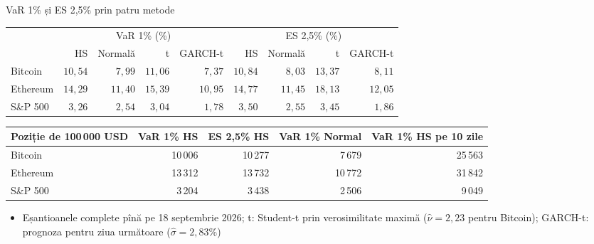 \begin{frame}{VaR 1\% și ES 2,5\% prin patru metode}
\itemsize{\footnotesize}
\begin{center}
\scriptsize
\begin{tabular}{lrrrrrrrr}
\toprule
& \multicolumn{4}{c}{VaR 1\% (\%)} & \multicolumn{4}{c}{ES 2,5\% (\%)} \\ & HS & Normală & t & GARCH-t & HS & Normală & t & GARCH-t \\
\midrule
Bitcoin & $10{,}54$ & $7{,}99$ & $11{,}06$ & $7{,}37$ & $10{,}84$ & $8{,}03$ & $13{,}37$ & $8{,}11$ \\
Ethereum & $14{,}29$ & $11{,}40$ & $15{,}39$ & $10{,}95$ & $14{,}77$ & $11{,}45$ & $18{,}13$ & $12{,}05$ \\
S\&P 500 & $3{,}26$ & $2{,}54$ & $3{,}04$ & $1{,}78$ & $3{,}50$ & $2{,}55$ & $3{,}45$ & $1{,}86$ \\
\bottomrule
\end{tabular}
\end{center}
\begin{center}
\scriptsize
\begin{tabular}{lrrrr}
\toprule
Poziție de 100\,000 USD & VaR 1\% HS & ES 2,5\% HS & VaR 1\% Normal & VaR 1\% HS pe 10 zile \\
\midrule
Bitcoin & 10\,006 & 10\,277 & 7\,679 & 25\,563 \\
Ethereum & 13\,312 & 13\,732 & 10\,772 & 31\,842 \\
S\&P 500 & 3\,204 & 3\,438 & 2\,506 & 9\,049 \\
\bottomrule
\end{tabular}
\end{center}
\begin{itemize}
    \item Eșantioanele complete pînă pe 18 septembrie 2026; t: Student-t prin verosimilitate maximă ($\hat\nu = 2{,}23$ pentru Bitcoin); GARCH-t: prognoza pentru ziua următoare ($\hat\sigma = 2{,}83\%$)
\end{itemize}
\end{frame}

